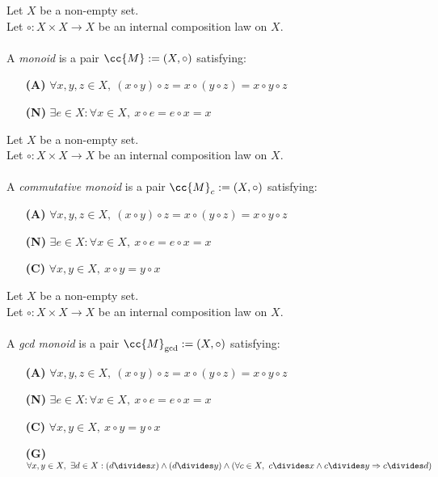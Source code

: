 \begin{definition-pre}[Monoid]
    \label{def:monoid}
    Let \(X\) be a non-empty set.\\
    Let \(\circ: X\times X \to X\) be an internal composition law on \(X\). \\\\
    A \textit{monoid} is a pair \(\cc{M}:= (X, \circ)\) satisfying:
    \begin{enumerate}
        \item [\textbf{(A)}] \(\forall x,y,z\in X,\ (x\circ y)\circ z= x\circ (y\circ z) = x\circ y \circ z\)
        \item [\textbf{(N)}] \(\exists e \in X : \forall x \in X,\ x\circ e = e \circ x = x\)
    \end{enumerate}
\end{definition-pre}

\begin{definition-pre}
    \label{def:commutative_monoid}
    Let \(X\) be a non-empty set.\\
    Let \(\circ: X\times X \to X\) be an internal composition law on \(X\). \\\\
    A \textit{commutative monoid} is a pair \(\cc{M}_c:= (X, \circ)\) satisfying:
    \begin{enumerate}
        \item [\textbf{(A)}] \(\forall x,y,z\in X,\ (x\circ y)\circ z= x\circ (y\circ z) = x\circ y \circ z\)
        \item [\textbf{(N)}] \(\exists e \in X : \forall x \in X,\ x\circ e = e \circ x = x\)
        \item [\textbf{(C)}] \(\forall x,y\in X,\ x\circ y = y\circ x\)
    \end{enumerate}
\end{definition-pre}

\begin{definition-pre}
    \label{def:gcd_monoid}
    Let \(X\) be a non-empty set.\\
    Let \(\circ: X\times X \to X\) be an internal composition law on \(X\). \\\\
    A \textit{gcd monoid} is a pair \(\cc{M}_{\gcd}:= (X, \circ)\) satisfying:
    \begin{enumerate}
        \item [\textbf{(A)}] \(\forall x,y,z\in X,\ (x\circ y)\circ z= x\circ (y\circ z) = x\circ y \circ z\)
        \item [\textbf{(N)}] \(\exists e \in X : \forall x \in X,\ x\circ e = e \circ x = x\)
        \item [\textbf{(C)}] \(\forall x,y\in X,\ x\circ y = y\circ x\)
        \item [\textbf{(G)}] \(\forall x,y\in X,\ \exists d \in X : (d\divides x) \land (d\divides y)
                             \land \left(\forall c \in X,\ c\divides x \land c\divides y \Rightarrow c\divides d\right)\)
    \end{enumerate}
\end{definition-pre}

